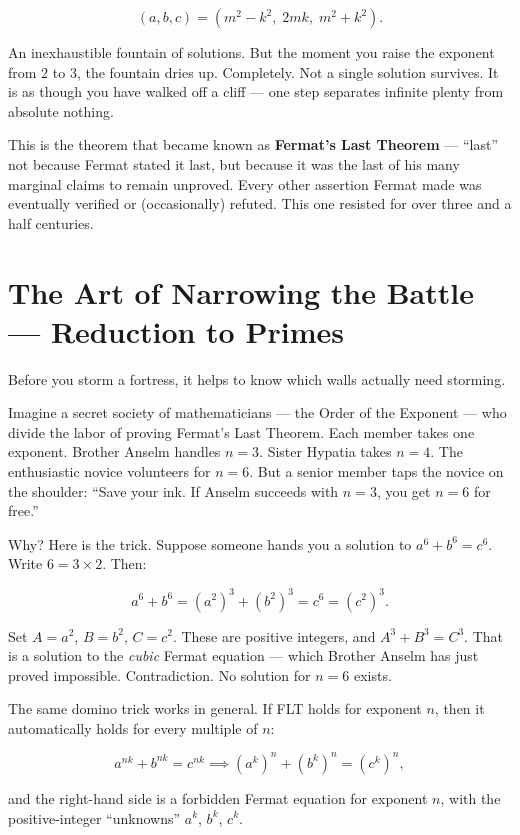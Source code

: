 \[(a, b, c) = (m^2 - k^2,\; 2mk,\; m^2 + k^2).\]

An inexhaustible fountain of solutions. But the moment you raise the exponent from \(2\) to \(3\), the fountain dries up. Completely. Not a single solution survives. It is as though you have walked off a cliff --- one step separates infinite plenty from absolute nothing.

This is the theorem that became known as \textbf{Fermat's Last Theorem} --- ``last'' not because Fermat stated it last, but because it was the last of his many marginal claims to remain unproved. Every other assertion Fermat made was eventually verified or (occasionally) refuted. This one resisted for over three and a half centuries.



\section{The Art of Narrowing the Battle --- Reduction to Primes}\label{ch10-the-art-of-narrowing-the-battle-reduction-to-primes}

Before you storm a fortress, it helps to know which walls actually need storming.

Imagine a secret society of mathematicians --- the Order of the Exponent --- who divide the labor of proving Fermat's Last Theorem. Each member takes one exponent. Brother Anselm handles \(n = 3\). Sister Hypatia takes \(n = 4\). The enthusiastic novice volunteers for \(n = 6\). But a senior member taps the novice on the shoulder: ``Save your ink. If Anselm succeeds with \(n = 3\), you get \(n = 6\) for free.''

Why? Here is the trick. Suppose someone hands you a solution to \(a^6 + b^6 = c^6\). Write \(6 = 3 \times 2\). Then:

\[a^6 + b^6 = (a^2)^3 + (b^2)^3 = c^6 = (c^2)^3.\]

Set \(A = a^2\), \(B = b^2\), \(C = c^2\). These are positive integers, and \(A^3 + B^3 = C^3\). That is a solution to the \emph{cubic} Fermat equation --- which Brother Anselm has just proved impossible. Contradiction. No solution for \(n = 6\) exists.

The same domino trick works in general. If FLT holds for exponent \(n\), then it automatically holds for every multiple of \(n\):

\[a^{nk} + b^{nk} = c^{nk} \implies (a^k)^n + (b^k)^n = (c^k)^n,\]

and the right-hand side is a forbidden Fermat equation for exponent \(n\), with the positive-integer ``unknowns'' \(a^k\), \(b^k\), \(c^k\).

